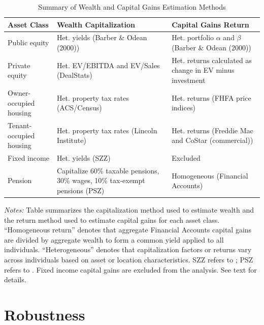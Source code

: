 \documentclass[12pt]{article}
\begin{document}

\begin{table}[H]
\centering
\caption{Summary of Wealth and Capital Gains Estimation Methods}
\label{tab:estimation_methods}
\small
\begin{tabularx}{\textwidth}{lXX}
\toprule
Asset Class & Wealth Capitalization & Capital Gains Return \\
\midrule
Public equity & Het. yields (Barber \& Odean (2000)) & Het. portfolio $\alpha$ and $\beta$ (Barber \& Odean (2000)) \\[6pt]
Private equity & Het. EV/EBITDA and EV/Sales (DealStats) & Het. returns calculated as change in EV minus investment \\[6pt]
Owner-occupied housing & Het. property tax rates (ACS/Census) & Het. returns (FHFA price indices) \\[6pt]
Tenant-occupied housing & Het. property tax rates (Lincoln Institute) & Het. returns (Freddie Mac and CoStar (commercial)) \\[6pt]
Fixed income & Het. yields (SZZ) & Excluded \\[6pt]
Pension & Capitalize 60\% taxable pensions, 30\% wages, 10\% tax-exempt pensions (PSZ) & Homogeneous (Financial Accounts) \\
\bottomrule
\end{tabularx}
\begin{minipage}{0.95\textwidth}
\vspace{0.5em}
\footnotesize
\textit{Notes:} Table summarizes the capitalization method used to estimate wealth and the return method used to estimate capital gains for each asset class. ``Homogeneous return'' denotes that aggregate Financial Accounts capital gains are divided by aggregate wealth to form a common yield applied to all individuals. ``Heterogeneous'' denotes that capitalization factors or returns vary across individuals based on asset or location characteristics. SZZ refers to \citet{smith2023}; PSZ refers to \citet{piketty2016distributional}. Fixed income capital gains are excluded from the analysis. See text for details.
\end{minipage}
\end{table}


\section{Robustness}
\end{document}

